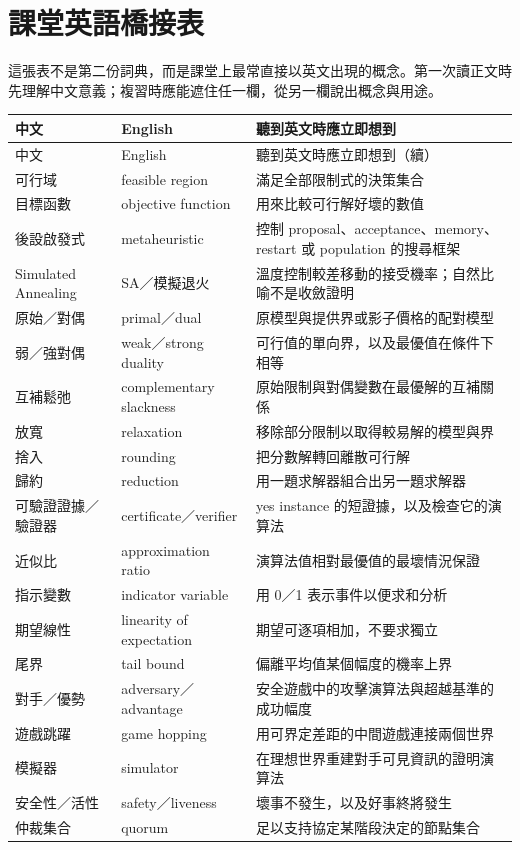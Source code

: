 \documentclass[11pt,a4paper,oneside,openany]{book}
\begin{document}
\section*{課堂英語橋接表}
這張表不是第二份詞典，而是課堂上最常直接以英文出現的概念。第一次讀正文時先理解中文意義；複習時應能遮住任一欄，從另一欄說出概念與用途。

\begin{longtable}{@{}p{}p{}p{}@{}}
\toprule
中文 & English & 聽到英文時應立即想到 \\
\midrule
\endfirsthead
\toprule
中文 & English & 聽到英文時應立即想到（續） \\
\midrule
\endhead
可行域 & feasible region & 滿足全部限制式的決策集合 \\
目標函數 & objective function & 用來比較可行解好壞的數值 \\
後設啟發式 & metaheuristic & 控制 proposal、acceptance、memory、restart 或 population 的搜尋框架 \\
Simulated Annealing & SA／模擬退火 & 溫度控制較差移動的接受機率；自然比喻不是收斂證明 \\
原始／對偶 & primal／dual & 原模型與提供界或影子價格的配對模型 \\
弱／強對偶 & weak／strong duality & 可行值的單向界，以及最優值在條件下相等 \\
互補鬆弛 & complementary slackness & 原始限制與對偶變數在最優解的互補關係 \\
放寬 & relaxation & 移除部分限制以取得較易解的模型與界 \\
捨入 & rounding & 把分數解轉回離散可行解 \\
歸約 & reduction & 用一題求解器組合出另一題求解器 \\
可驗證證據／驗證器 & certificate／verifier & yes instance 的短證據，以及檢查它的演算法 \\
近似比 & approximation ratio & 演算法值相對最優值的最壞情況保證 \\
指示變數 & indicator variable & 用 0／1 表示事件以便求和分析 \\
期望線性 & linearity of expectation & 期望可逐項相加，不要求獨立 \\
尾界 & tail bound & 偏離平均值某個幅度的機率上界 \\
對手／優勢 & adversary／advantage & 安全遊戲中的攻擊演算法與超越基準的成功幅度 \\
遊戲跳躍 & game hopping & 用可界定差距的中間遊戲連接兩個世界 \\
模擬器 & simulator & 在理想世界重建對手可見資訊的證明演算法 \\
安全性／活性 & safety／liveness & 壞事不發生，以及好事終將發生 \\
仲裁集合 & quorum & 足以支持協定某階段決定的節點集合 \\
\bottomrule
\end{longtable}
\end{document}
